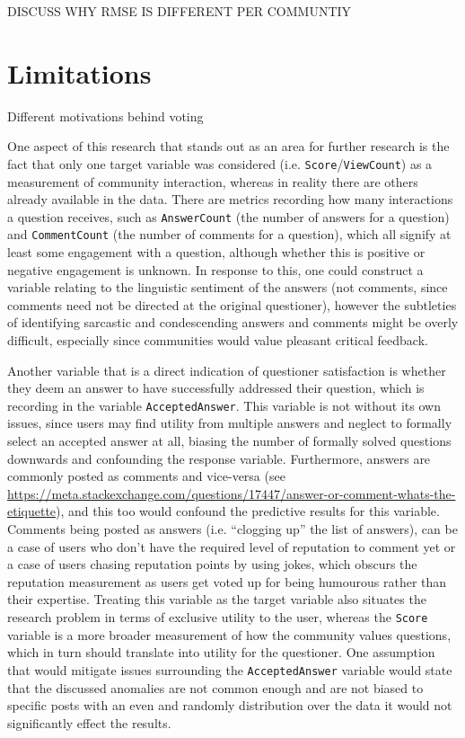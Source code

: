 \documentclass[11pt,preprint, authoryear]{article}
\numberwithin{equation}{section}
\numberwithin{figure}{section}
\begin{document}
\normalsize

DISCUSS WHY RMSE IS DIFFERENT PER COMMUNTIY

\section{\texorpdfstring{Limitations
\label{Limit}}{Limitations }}\label{limitations}

Different motivations behind voting

One aspect of this research that stands out as an area for further
research is the fact that only one target variable was considered (i.e.
\texttt{Score}/\texttt{ViewCount}) as a measurement of community
interaction, whereas in reality there are others already available in
the data. There are metrics recording how many interactions a question
receives, such as \texttt{AnswerCount} (the number of answers for a
question) and \texttt{CommentCount} (the number of comments for a
question), which all signify at least some engagement with a question,
although whether this is positive or negative engagement is unknown. In
response to this, one could construct a variable relating to the
linguistic sentiment of the answers (not comments, since comments need
not be directed at the original questioner), however the subtleties of
identifying sarcastic and condescending answers and comments might be
overly difficult, especially since communities would value pleasant
critical feedback.

Another variable that is a direct indication of questioner satisfaction
is whether they deem an answer to have successfully addressed their
question, which is recording in the variable \texttt{AcceptedAnswer}.
This variable is not without its own issues, since users may find
utility from multiple answers and neglect to formally select an accepted
answer at all, biasing the number of formally solved questions downwards
and confounding the response variable. Furthermore, answers are commonly
posted as comments and vice-versa (see
\url{https://meta.stackexchange.com/questions/17447/answer-or-comment-whats-the-etiquette}),
and this too would confound the predictive results for this variable.
Comments being posted as answers (i.e. ``clogging up'' the list of
answers), can be a case of users who don't have the required level of
reputation to comment yet or a case of users chasing reputation points
by using jokes, which obscurs the reputation measurement as users get
voted up for being humourous rather than their expertise. Treating this
variable as the target variable also situates the research problem in
terms of exclusive utility to the user, whereas the \texttt{Score}
variable is a more broader measurement of how the community values
questions, which in turn should translate into utility for the
questioner. One assumption that would mitigate issues surrounding the
\texttt{AcceptedAnswer} variable would state that the discussed
anomalies are not common enough and are not biased to specific posts
with an even and randomly distribution over the data it would not
significantly effect the results.
\end{document}
